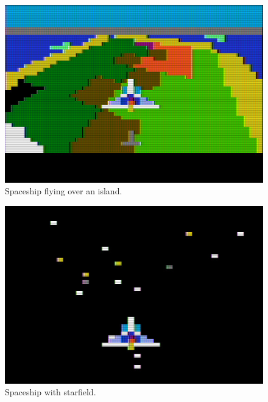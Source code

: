 \documentclass[twocolumn]{article}
\begin{document}
\begin{figure}[tb]
\begin{center}
\includegraphics[width=\columnwidth]{figures/m7_screen4.jpg}
\caption{Spaceship flying over an island.\label{fig:tb1}}
\end{center}
\end{figure}

\begin{figure}[tb]
\begin{center}
\includegraphics[width=\columnwidth]{figures/m7_screen3.jpg}
\end{center}
\caption{Spaceship with starfield.\label{fig:stars}}
\end{figure}
\end{document}
